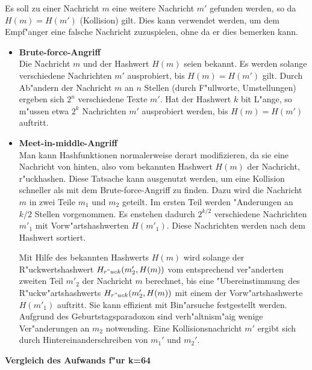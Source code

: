 Es soll zu einer Nachricht $m$ eine weitere Nachricht $m'$ gefunden werden, 
so da\3 $H(m)=H(m')$ (Kollision) gilt. Dies kann verwendet werden, um dem
Empf"anger eine falsche Nachricht zuzuspielen, ohne da\3 er dies bemerken kann.
\begin{itemize}
\item{\bf Brute-force-Angriff} \\
   Die Nachricht $m$ und der Hashwert $H(m)$ seien bekannt. Es werden
   solange verschiedene Nachrichten $m'$ ausprobiert, bis $H(m)=H(m')$
   gilt. Durch Ab"andern der Nachricht $m$ an $n$ Stellen (durch
   F"ullworte, Umstellungen) ergeben sich $2^n$ verschiedene Texte
   $m'$. Hat der Hashwert $k$ bit L"ange, so m"ussen etwa $2^k$
   Nachrichten $m'$ ausprobiert werden, bis $H(m)=H(m')$ auftritt.
\item{\bf Meet-in-middle-Angriff} \\
   Man kann Hashfunktionen normalerweise derart modifizieren, da\3 sie
   eine Nachricht von hinten, also vom bekannten Hashwert $H(m)$ der
   Nachricht, r"uckhashen.  Diese Tatsache kann ausgenutzt werden,
   um eine Kollision schneller als mit dem Brute-force-Angriff zu
   finden. Dazu wird die Nachricht $m$ in zwei Teile $m_1$ und $m_2$
   geteilt. Im ersten Teil werden "Anderungen an $k/2$ Stellen
   vorgenommen. Es enstehen dadurch $2^{k/2}$ verschiedene Nachrichten
   $m'_1$ mit Vorw"artshashwerten $H(m'_1)$. Diese Nachrichten werden nach
   dem Hashwert sortiert.

   Mit Hilfe des bekannten Hashwerts $H(m)$ wird solange der  
   R"uckwerts\-hashwert $H_{r"uck}(m'_2,H(m))$ vom entsprechend ver"anderten 
   zweiten Teil $m'_2$ der Nachricht $m$ berechnet, bis eine "Ubereinstimmung
   des R"uckw"artshashwerts $H_{r"uck}(m'_2,H(m))$ mit einem der
   Vorw"artshashwerte $H(m'_1)$ auftritt. Sie kann effizient
   mit Bin"arsuche festgestellt werden.  Aufgrund des 
   Geburtstagsparadoxon sind verh"altnism"a\3ig wenige Ver"anderungen 
   an $m_2$ notwending. Eine Kollisionsnachricht 
   $m'$ ergibt sich durch Hintereinanderschreiben von $m_1'$ und $m_2'$.
\end{itemize}

{\bf Vergleich des Aufwands f"ur k=64}

